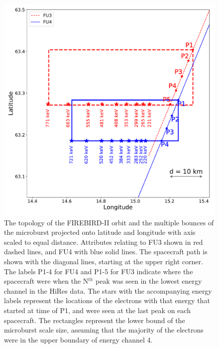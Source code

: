 \documentclass[draft, linenumbers]{agujournal}
\begin{document}
\begin{figure}
\includegraphics[width=\textwidth]{decay_microburst_distance_corrected_CH4_last_pk_drift_color_2.pdf}
\caption{The topology of the FIREBIRD-II orbit and the multiple bounces of the microburst projected onto latitude and longitude with axis scaled to equal distance. Attributes relating to FU3 shown in red dashed lines, and FU4 with blue solid lines. The spacecraft path is shown with the diagonal lines, starting at the upper right corner. The labels P1-4 for FU4 and P1-5 for FU3 indicate where the spacecraft were when the N$^{th}$ peak was seen in the lowest energy channel in the HiRes data. The stars with the accompanying energy labels represent the locations of the electrons with that energy that started at time of P1, and were seen at the last peak on each spacecraft. The rectangles represent the lower bound of the microburst scale size, assuming that the majority of the electrons were in the upper boundary of energy channel 4.}
\label{map_plot}
\end{figure}


\end{document}
